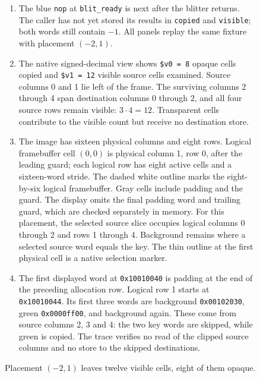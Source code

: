 \begin{figure}[htbp]
  \par\smallskip
  \begin{minipage}{\linewidth}
    \small
    \begin{enumerate}
      \setlength{\itemsep}{2pt}
            \setlength{\parsep}{0pt}
      \item The blue \texttt{nop} at \texttt{blit\_ready} is next after the blitter returns. The caller has not yet stored its results in \texttt{copied} and \texttt{visible}; both words still contain $-1$. All panels replay the same fixture with placement $(-2,1)$.
      \item The native signed-decimal view shows \texttt{\$v0 = 8} opaque cells copied and \texttt{\$v1 = 12} visible source cells examined. Source columns 0 and 1 lie left of the frame. The surviving columns 2 through 4 span destination columns 0 through 2, and all four source rows remain visible: $3\cdot4=12$. Transparent cells contribute to the visible count but receive no destination store.
      \item The image has sixteen physical columns and eight rows. Logical framebuffer cell $(0,0)$ is physical column 1, row 0, after the leading guard; each logical row has eight active cells and a sixteen-word stride. The dashed white outline marks the eight-by-six logical framebuffer. Gray cells include padding and the guard. The display omits the final padding word and trailing guard, which are checked separately in memory. For this placement, the selected source slice occupies logical columns 0 through 2 and rows 1 through 4. Background remains where a selected source word equals the key. The thin outline at the first physical cell is a native selection marker.
      \item The first displayed word at \texttt{0x10010040} is padding at the end of the preceding allocation row. Logical row 1 starts at \texttt{0x10010044}. Its first three words are background \texttt{0x00102030}, green \texttt{0x0000ff00}, and background again. These come from source columns 2, 3 and 4: the two key words are skipped, while green is copied. The trace verifies no read of the clipped source columns and no store to the skipped destinations.
    \end{enumerate}
  \end{minipage}
  \caption{Placement $(-2,1)$ leaves twelve visible cells, eight of them opaque.}
  \label{capture:016-clipped-sprite-blitter-f01}
  \label{blit-f01}
\end{figure}
\par
